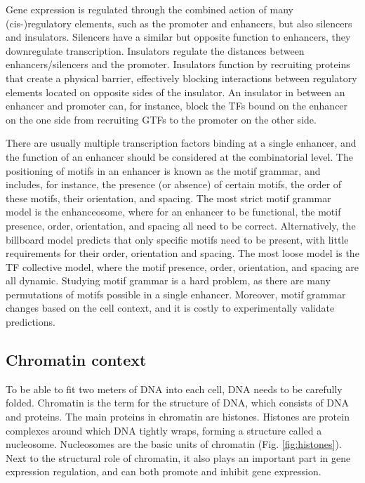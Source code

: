 Gene expression is regulated through the combined action of many (cis-)regulatory elements, such as the promoter and enhancers, but also silencers and insulators\cite{Spitz2012}. Silencers have a similar but opposite function to enhancers, they downregulate transcription. Insulators regulate the distances between enhancers/silencers and the promoter. Insulators function by recruiting proteins that create a physical barrier, effectively blocking interactions between regulatory elements located on opposite sides of the insulator. An insulator in between an enhancer and promoter can, for instance, block the TFs bound on the enhancer on the one side from recruiting GTFs to the promoter on the other side.

There are usually multiple transcription factors binding at a single enhancer, and the function of an enhancer should be considered at the combinatorial level\cite{Spitz2012}. The positioning of motifs in an enhancer is known as the motif grammar, and includes, for instance, the presence (or absence) of certain motifs, the order of these motifs, their orientation, and spacing\cite{Nagy2020}. The most strict motif grammar model is the enhanceosome, where for an enhancer to be functional, the motif presence, order, orientation, and spacing all need to be correct\cite{Arnosti2005}. Alternatively, the billboard model predicts that only specific motifs need to be present, with little requirements for their order, orientation and spacing. The most loose model is the TF collective model, where the motif presence, order, orientation, and spacing are all dynamic\cite{Long2016}. Studying motif grammar is a hard problem, as there are many permutations of motifs possible in a single enhancer. Moreover, motif grammar changes based on the cell context, and it is costly to experimentally validate predictions. 

\subsection{Chromatin context}

To be able to fit two meters of DNA into each cell, DNA needs to be carefully folded. Chromatin is the term for the structure of DNA, which consists of DNA and proteins. The main proteins in chromatin are histones. Histones are protein complexes around which DNA tightly wraps, forming a structure called a nucleosome. Nucleosomes are the basic units of chromatin (Fig. \ref{fig:histones}). Next to the structural role of chromatin,  it also plays an important part in gene expression regulation, and can both promote and inhibit gene expression.

